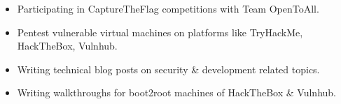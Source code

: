 \begin{itemize}
    \item Participating in CaptureTheFlag competitions with Team OpenToAll.
    
    \divider
    
    \item Pentest vulnerable virtual machines on platforms like TryHackMe, HackTheBox, Vulnhub.
    
    \divider
    
    \item Writing technical blog posts on security \& development related topics.
    
    \divider
    
    \item Writing walkthroughs for boot2root machines of HackTheBox \& Vulnhub.
    
\end{itemize}
